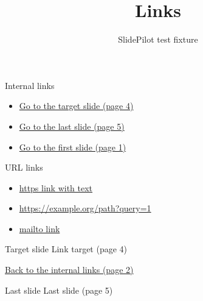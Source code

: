 \documentclass{beamer}
\title{Links}
\subtitle{SlidePilot test fixture}
\begin{document}
\begin{frame}[label=first]
  \titlepage
\end{frame}

\begin{frame}[label=back]{Internal links}
  \begin{itemize}
    \item \hyperlink{target}{Go to the target slide (page 4)}
    \item \hyperlink{last}{Go to the last slide (page 5)}
    \item \hyperlink{first}{Go to the first slide (page 1)}
  \end{itemize}
\end{frame}

\begin{frame}{URL links}
  \begin{itemize}
    \item \href{https://example.com}{https link with text}
    \item \url{https://example.org/path?query=1}
    \item \href{mailto:someone@example.com}{mailto link}
  \end{itemize}
\end{frame}

\begin{frame}[label=target]{Target slide}
  \centering
  \Large Link target (page 4)

  \normalsize
  \hyperlink{back}{Back to the internal links (page 2)}
\end{frame}

\begin{frame}[label=last]{Last slide}
  \centering
  \Large Last slide (page 5)
\end{frame}
\end{document}
